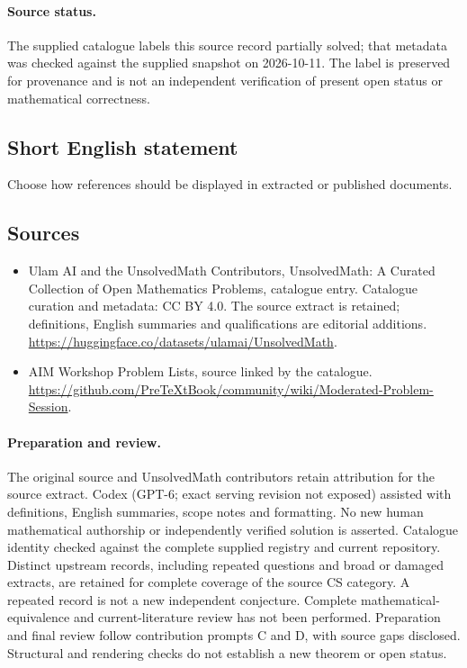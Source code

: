 \documentclass[11pt]{article}
\begin{document}
\paragraph{Source status.}
The supplied catalogue labels this source record partially solved; that metadata was checked against the supplied snapshot on 2026-10-11. The label is preserved for provenance and is not an independent verification of present open status or mathematical correctness.
\subsection{Short English statement}
Choose how references should be displayed in extracted or published documents.
\subsection{Sources}
\begin{itemize}
\item[\hypertarget{source:statement:1}{S1}] Ulam AI and the UnsolvedMath Contributors, UnsolvedMath: A Curated Collection of Open Mathematics Problems, catalogue entry. Catalogue curation and metadata: CC BY 4.0. The source extract is retained; definitions, English summaries and qualifications are editorial additions.
\url{https://huggingface.co/datasets/ulamai/UnsolvedMath}.
\item[\hypertarget{source:statement:2}{S2}] AIM Workshop Problem Lists, source linked by the catalogue.
\url{https://github.com/PreTeXtBook/community/wiki/Moderated-Problem-Session}.
\end{itemize}
\paragraph{Preparation and review.}
The original source and UnsolvedMath contributors retain attribution for the source extract. Codex (GPT-6; exact serving revision not exposed) assisted with definitions, English summaries, scope notes and formatting. No new human mathematical authorship or independently verified solution is asserted. Catalogue identity checked against the complete supplied registry and current repository. Distinct upstream records, including repeated questions and broad or damaged extracts, are retained for complete coverage of the source CS category. A repeated record is not a new independent conjecture. Complete mathematical-equivalence and current-literature review has not been performed. Preparation and final review follow contribution prompts C and D, with source gaps disclosed. Structural and rendering checks do not establish a new theorem or open status.
\label{end:statement}
\end{document}
